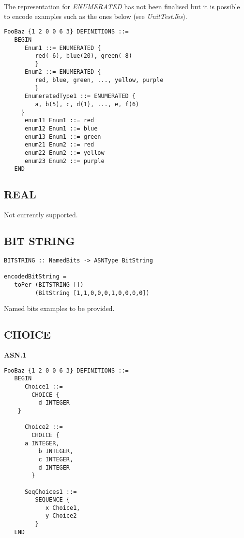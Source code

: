 \documentclass{article}
\begin{document}
The representation for {\em ENUMERATED} has not been finalised but it is
possible to encode examples such as the ones below (see {\em UnitTest.lhs}).

\begin{lstlisting}[frame=single]
FooBaz {1 2 0 0 6 3} DEFINITIONS ::=
   BEGIN
      Enum1 ::= ENUMERATED {
         red(-6), blue(20), green(-8)
         }
      Enum2 ::= ENUMERATED {
         red, blue, green, ..., yellow, purple
         }
      EnumeratedType1 ::= ENUMERATED {
         a, b(5), c, d(1), ..., e, f(6)
	 }
      enum11 Enum1 ::= red
      enum12 Enum1 ::= blue
      enum13 Enum1 ::= green
      enum21 Enum2 ::= red
      enum22 Enum2 ::= yellow
      enum23 Enum2 ::= purple
   END
\end{lstlisting}

\subsection{REAL}

Not currently supported.

\subsection{BIT STRING}

\begin{lstlisting}[frame=single]
BITSTRING :: NamedBits -> ASNType BitString

encodedBitString = 
   toPer (BITSTRING []) 
         (BitString [1,1,0,0,0,1,0,0,0,0])
\end{lstlisting}

Named bits examples to be provided.

\subsection{CHOICE}

{\bf ASN.1}

\begin{lstlisting}[frame=single]
FooBaz {1 2 0 0 6 3} DEFINITIONS ::=
   BEGIN
      Choice1 ::= 
        CHOICE {
          d INTEGER
	}
      
      Choice2 ::= 
        CHOICE {
	  a INTEGER,
          b INTEGER,
          c INTEGER,
          d INTEGER
        }

      SeqChoices1 ::=
         SEQUENCE {
            x Choice1,
            y Choice2
         }
   END

\end{lstlisting}
\end{document}
